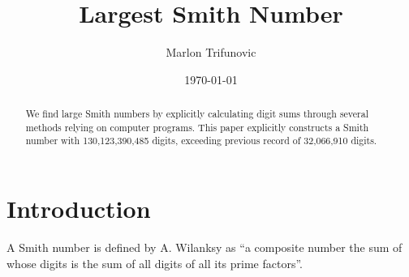 \documentclass{amsart}
\numberwithin{equation}{section}
\theoremstyle{plain} %
\theoremstyle{definition}
\theoremstyle{remark}
\begin{document}
\title{Largest Smith Number}


\author{Marlon Trifunovic}

\address{}






\date{\today}

 \begin{abstract}
We find large Smith numbers by explicitly calculating digit sums through several methods relying on computer programs. This paper explicitly constructs a Smith number with 130,123,390,485 digits, exceeding previous record of 32,066,910 digits.
 \end{abstract}


\maketitle

 \tableofcontents


 \section{Introduction}

A Smith number is defined by A. Wilanksy as ``a composite number the sum of whose digits is the sum of all digits of all its prime factors''\cite{Wilansky1982}.
\end{document}
